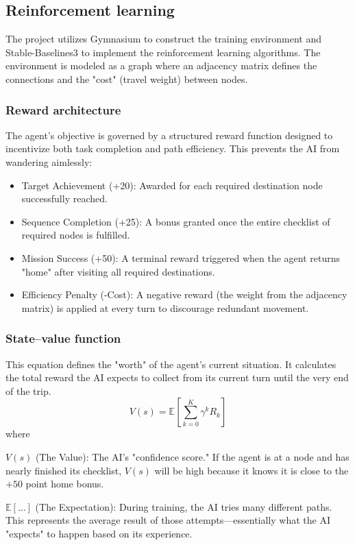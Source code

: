 \documentclass[conference]{IEEEtran}
\begin{document}
\subsection{Reinforcement learning}

The project utilizes Gymnasium to construct the training environment and Stable-Baselines3 to implement the reinforcement learning algorithms. The environment is modeled as a graph where an adjacency matrix defines the connections and the "cost" (travel weight) between nodes.

\subsubsection{Reward architecture}

The agent's objective is governed by a structured reward function designed to incentivize both task completion and path efficiency. This prevents the AI from wandering aimlessly:

\begin{itemize}
    \item Target Achievement (+20): Awarded for each required destination node successfully reached.
    \item Sequence Completion (+25): A bonus granted once the entire checklist of required nodes is fulfilled.
    \item Mission Success (+50): A terminal reward triggered when the agent returns "home" after visiting all required destinations.
    \item Efficiency Penalty (-Cost): A negative reward (the weight from the adjacency matrix) is applied at every turn to discourage redundant movement.
\end{itemize}

\subsubsection{State--value function}

This equation defines the "worth" of the agent's current situation. It calculates the total reward the AI expects to collect from its current turn until the very end of the trip.
\[
    V(s) = \mathbb{E} \left[ \sum_{k=0}^{K} \gamma^k R_{k} \right]
\]
where

$V(s)$ (The Value): The AI's "confidence score." If the agent is at a node and has nearly finished its checklist, $V(s)$ will be high because it knows it is close to the $+50$ point home bonus.

$\mathbb{E}[\dots]$ (The Expectation): During training, the AI tries many different paths. This represents the average result of those attempts—essentially what the AI "expects" to happen based on its experience.
\end{document}
